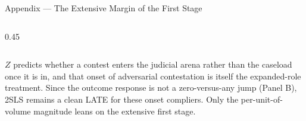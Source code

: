 \begin{frame}{Appendix --- The Extensive Margin of the First Stage}
\begin{columns}[T]
\begin{column}{0.45\linewidth}
\end{column}
\end{columns}
{\centering\scriptsize $Z$ predicts whether a contest enters the judicial arena rather than the caseload once it is in, and that onset of adversarial contestation is itself the expanded-role treatment. Since the outcome response is not a zero-versus-any jump (Panel B), 2SLS remains a clean LATE for these onset compliers. Only the per-unit-of-volume magnitude leans on the extensive first stage.\par}
\smallskip
\centerline{\hyperlink{src:firststage}{}\quad\hyperlink{app:tdef}{}\quad\hyperlink{src:spine1}{}}
\end{frame}
